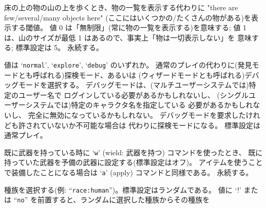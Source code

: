 床の上の物の山の上を歩くとき、物の一覧を表示する代わりに
"there are few/several/many objects here"
(ここにはいくつかの/たくさんの物がある)を表示する閾値。
値 0 は「無制限」(常に物の一覧を表示する)を意味する;
値 1 は、山のサイズが最低 1 はあるので、事実上「物は一切表示しない」を
意味する; 標準設定は 5。
永続する。
\item[\ib{playmode}]
値は `{\tt normal}', `{\tt explore}', `{\tt debug}' のいずれか。
通常のプレイの代わりに(発見モードとも呼ばれる)探検モード、あるいは
(ウィザードモードとも呼ばれる)デバッグモードを選択する。
デバッグモードは、(マルチユーザーシステムでは)特定のユーザー名で
ログインしている必要があるかもしれないし、
(シングルユーザーシステムでは)特定のキャラクタ名を指定している
必要があるかもしれないし、
完全に無効になっているかもしれない。
デバッグモードを要求したけれども許されていないか不可能な場合は
代わりに探検モードになる。
標準設定は通常プレイ。
\item[\ib{pushweapon}]
既に武器を持っている時に `{\tt w}' (wield: 武器を持つ) コマンドを使ったとき、
既に持っていた武器を予備の武器に設定する(標準設定はオフ)。
アイテムを使うことで装備したことになる場合は
`{\tt a}' (apply) コマンドと同様である。
永続する。
\item[\ib{race}]
種族を選択する(例: ``{\tt race:human}'')。標準設定はランダムである。
値に `!' または ``{\tt no}'' を前置すると、ランダムに選択した種族からその種族を
